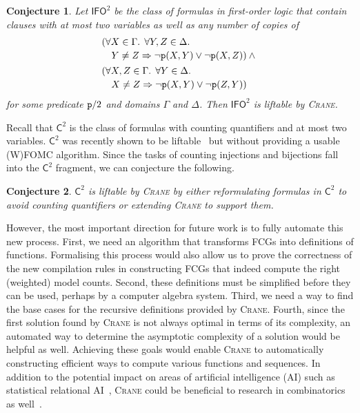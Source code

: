 \documentclass{article}
\newtheorem{conjecture}{Conjecture}
\theoremstyle{definition}
\theoremstyle{remark}
\newcommand{\Ctwo}{$\mathsf{C}^{2}$}
\newcommand{\IFO}{$\mathsf{I}\mathsf{FO}^{2}$}
\begin{document}
\begin{conjecture}
  Let \IFO{} be the class of formulas in first-order logic that contain clauses
  with at most two variables as well as any number of copies of
  \begin{align*}
    &\begin{multlined}[t]
      (\forall X \in \Gamma\text{. }\forall Y, Z \in \Delta\text{. }\\
      Y \ne Z \Rightarrow \neg \texttt{\textup{p}}(X, Y) \lor \neg \texttt{\textup{p}}(X, Z)) \land{}
    \end{multlined}\\
    &\begin{multlined}[t]
      (\forall X, Z \in \Gamma\text{. }\forall Y \in \Delta\text{. }\\
      X \ne Z \Rightarrow \neg \texttt{\textup{p}}(X, Y) \lor \neg \texttt{\textup{p}}(Z, Y))
    \end{multlined}
  \end{align*}
  for some predicate $\texttt{\textup{p}}/2$ and domains $\Gamma$ and $\Delta$.
  Then \IFO{} is liftable by \textsc{Crane}.
\end{conjecture}

Recall that \Ctwo{} is the class of formulas with counting quantifiers and at
most two variables. \Ctwo{} was recently shown to be
liftable~\cite{DBLP:journals/jair/Kuzelka21} but without providing a usable
(W)FOMC algorithm. Since the tasks of counting injections and bijections fall
into the \Ctwo{} fragment, we can conjecture the following.

\begin{conjecture}
  \Ctwo{} is liftable by \textsc{Crane} by either reformulating formulas in
  \Ctwo{} to avoid counting quantifiers or extending \textsc{Crane} to support
  them.
\end{conjecture}

However, the most important direction for future work is to fully automate this
new process. First, we need an algorithm that transforms FCGs into definitions
of functions. Formalising this process would also allow us to prove the
correctness of the new compilation rules in constructing FCGs that indeed
compute the right (weighted) model counts. Second, these definitions must be
simplified before they can be used, perhaps by a computer algebra system. Third,
we need a way to find the base cases for the recursive definitions provided by
\textsc{Crane}. Fourth, since the first solution found by \textsc{Crane} is not
always optimal in terms of its complexity, an automated way to determine the
asymptotic complexity of a solution would be helpful as well. Achieving these
goals would enable \textsc{Crane} to automatically constructing efficient ways
to compute various functions and sequences. In addition to the potential impact
on areas of artificial intelligence (AI) such as statistical relational
AI~\cite{DBLP:series/synthesis/2016Raedt}, \textsc{Crane} could be beneficial to
research in combinatorics as well~\cite{DBLP:conf/ilp/BarvinekB0ZK21}.



\end{document}
